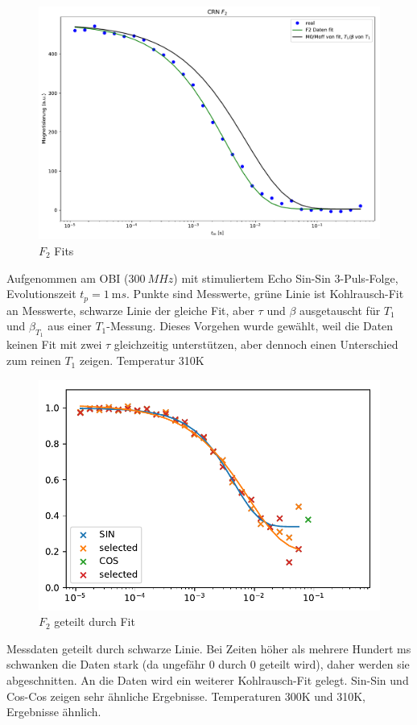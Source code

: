 \begin{figure}
	\begin{center}
		\includegraphics[width=\textwidth]{graphics/plots/F2/f2_fits.pdf}
	\end{center}
	\caption{$F_2$ Fits} \label{fig:res:F_2_fit}
\end{figure}
Aufgenommen am OBI ($\SI{300}{MHz}$) mit stimuliertem Echo Sin-Sin 3-Puls-Folge, Evolutionszeit $t_p = \SI{1}{\milli s}$. Punkte sind Messwerte, grüne Linie ist Kohlrausch-Fit an Messwerte, schwarze Linie der gleiche Fit, aber $\tau$ und $\beta$ ausgetauscht für $T_1$ und $\beta_{T_1}$ aus einer $T_1$-Messung. Dieses Vorgehen wurde gewählt, weil die Daten keinen Fit mit zwei $\tau$ gleichzeitig unterstützen, aber dennoch einen Unterschied zum reinen $T_1$ zeigen. Temperatur 310K


\begin{figure}
	\begin{center}
		\includegraphics[width=\textwidth]{graphics/plots/F2/f2_fit.pdf}
	\end{center}
	\caption{$F_2$ geteilt durch Fit} \label{fig:res:F_2_T_1}
\end{figure}
Messdaten geteilt durch schwarze Linie. Bei Zeiten höher als mehrere Hundert ms schwanken die Daten stark (da ungefähr 0 durch 0 geteilt wird), daher werden sie abgeschnitten. An die Daten wird ein weiterer Kohlrausch-Fit gelegt. Sin-Sin und Cos-Cos zeigen sehr ähnliche Ergebnisse. Temperaturen 300K und 310K, Ergebnisse ähnlich.



